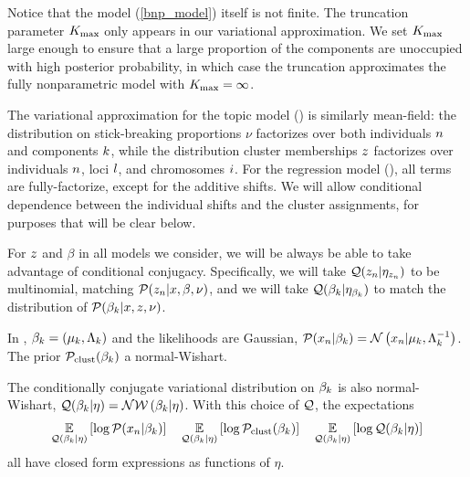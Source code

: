 Notice that the model (\eqref{bnp_model}) itself is not finite. The truncation
parameter ${K_{\mathrm{max}}}$ only appears in our variational approximation.
We set ${K_{\mathrm{max}}}$ large enough to ensure that a large
proportion of the components are unoccupied with high posterior probability,
in which case the truncation approximates the fully nonparametric model with ${K_{\mathrm{max}}} = \infty$.

The variational approximation for the topic model ()
is similarly mean-field: the distribution on stick-breaking proportions $\nu$
factorizes over
both individuals $n$ and components $k$, while the distribution
cluster memberships $z$
factorizes over individuals $n$, loci $l$, and chromosomes $i$.
For the regression model (), all terms are fully-factorize,
except for the additive shifts.
We will allow conditional dependence between the
individual shifts and the cluster assignments, for purposes that will be clear below.

For $z$ and $\beta$ in all models we consider, we will be always be able to
take advantage of conditional conjugacy. Specifically, we will take $\mathcal{Q}(z_{n}
\vert \eta_{z_n})$ to be multinomial, matching $\mathcal{P}(z_{n}
\vert x, \beta, \nu)$, and we will take $\mathcal{Q}(\beta_k \vert \eta_{\beta_k})$
to match the distribution of $\mathcal{P}(\beta_{k} \vert x, z, \nu)$.



\begin{ex}
%
In , $\beta_k = (\mu_k, \Lambda_k)$ and the likelihoods are Gaussian,
$\mathcal{P}(x_n \vert \beta_k) = \mathcal{N}\left(x_n \vert \mu_k, \Lambda_k^{-1}\right)$.
The prior $\mathcal{P}_{\mathrm{clust}}(\beta_k)$ a normal-Wishart.

The conditionally conjugate variational distribution on $\beta_k$ is
also normal-Wishart, $\mathcal{Q}(\beta_k \vert \eta) = \mathcal{N}\mathcal{W}\left(\beta_k \vert \eta\right)$.
With this choice of $\mathcal{Q}$, the expectations
\begin{align*}
\underset{\mathcal{Q}(\beta_k \vert \eta)}{\mathbb{E}}\left[\log \mathcal{P}(x_n \vert \beta_k)\right] \quad
\underset{\mathcal{Q}(\beta_k \vert \eta)}{\mathbb{E}}\left[\log \mathcal{P}_{\mathrm{clust}}(\beta_k)\right] \quad
\underset{\mathcal{Q}(\beta_k \vert \eta)}{\mathbb{E}}\left[\log \mathcal{Q}(\beta_k \vert \eta)\right]
\end{align*}
all have closed form expressions as functions of $\eta$.
%
\end{ex}

